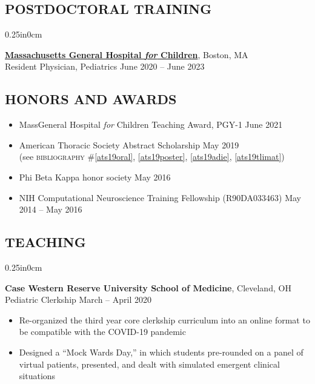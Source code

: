 \documentclass[11pt]{article}
\newcommand{\mysec}[1]{\subsection*{\uppercase{#1}}}
\newcommand{\blockindent}{0.25in}
\newcommand{\school}[4]{
\textbf{#1}, {#2} \\
{#3} \hfill {#4}\\
}
\newcommand{\job}[4]{
\textbf{#1}, {#2} \\
{#3} \hfill {#4}\\
}
\begin{document}

\vspace{-0.5mm}
\mysec{Postdoctoral Training}
\begin{adjustwidth}{\blockindent}{0cm}

\school{\href{https://www.massgeneral.org/children}{\textbf{Massachusetts General Hospital \textit{for} Children}}}{Boston, MA}{Resident Physician, Pediatrics}{June 2020 -- June 2023}

\end{adjustwidth}


\vspace{1pt}
\mysec{Honors and Awards}

\begin{itemize}

	\vspace{-6pt}
	\item MassGeneral Hospital \textit{for} Children Teaching Award, PGY-1 \hfill June 2021

	\vspace{3pt}
	\item American Thoracic Society Abstract Scholarship \hfill May 2019\\
	(see \textsc{bibliography} \#\ref{ats19oral}, \ref{ats19poster}, \ref{ats19adie}, \ref{ats19tlimat})

	\vspace{3pt}
	\item Phi Beta Kappa honor society \hfill May 2016

	\vspace{3pt}
	\item NIH Computational Neuroscience Training Fellowship {\footnotesize(R90DA033463)} \hfill May 2014 -- May 2016

\end{itemize}



\vspace{1pt}
\mysec{Teaching}
\begin{adjustwidth}{\blockindent}{0cm}

\job{Case Western Reserve University School of Medicine}{Cleveland, OH}{Pediatric Clerkship}{March -- April 2020}
\begin{itemize}
	\item Re-organized the third year core clerkship curriculum into an online format to be compatible with the COVID-19 pandemic
	\item Designed a ``Mock Wards Day,'' in which students pre-rounded on a panel of virtual patients, presented, and dealt with simulated emergent clinical situations
\end{itemize}

\end{adjustwidth}
\end{document}
